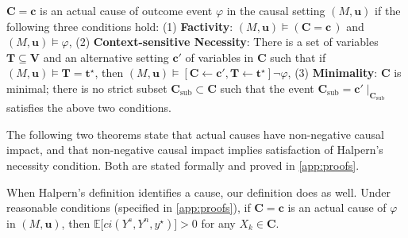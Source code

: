 \documentclass[anon,12pt]{clear2026} %
\begin{document}
\begin{definition} \label{def:ac}
    \(\mathbf{C} = \mathbf{c}\) is an actual cause of outcome event \(\varphi\) in the causal setting \((M, \mathbf{u})\) if the following three conditions hold: (1) \textbf{Factivity}: \((M, \mathbf{u}) \vDash (\mathbf{C} = \mathbf{c}\,)\) and \((M, \mathbf{u}) \vDash \varphi\), (2)  \textbf{Context-sensitive Necessity}: There is a set of variables \(\mathbf{T} \subseteq \mathbf{V}\) and an alternative setting \(\mathbf{c'}\) of variables in \(\mathbf{C}\) such that if \((M, \mathbf{u}) \vDash \mathbf{T} = \mathbf{t^\star}\), then $(M, \mathbf{u}) \vDash [\mathbf{C} \leftarrow \mathbf{c'}, \mathbf{T} \leftarrow \mathbf{t^\star}] \neg \varphi$, (3)  \textbf{Minimality}: \(\mathbf{C}\) is minimal; there is no strict subset $\mathbf{C_{\mathrm{sub}}} \subset \mathbf{C}$ such that the event $\mathbf{C_{\mathrm{sub}}} = \mathbf{c}'\!\mid_{\mathbf{C_{\mathrm{sub}}}}$ satisfies the above two conditions.
\end{definition}


The following two theorems state that actual causes have non-negative causal impact, and that non-negative causal impact implies satisfaction of Halpern's necessity condition. Both are stated formally and proved in \cref{app:proofs}.

\begin{theorem}[Informal]\label{th:ac->positive}  When Halpern's definition identifies a cause, our definition does as well. 
Under reasonable conditions (specified in \cref{app:proofs}), if $\mathbf{C} = \mathbf{c}$ is an actual cause of $\varphi$ in $(M, \mathbf{u})$, then $\mathbb{E} \big[ ci(Y^s, Y^n, y^\star) \big] > 0$ for any $X_k\in \mathbf{C}$.

\end{theorem}
\end{document}
